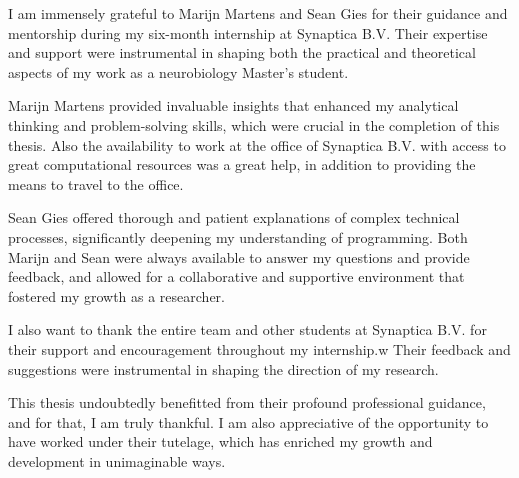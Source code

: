 \noindent I am immensely grateful to Marijn Martens and Sean Gies for their guidance and mentorship
during my six-month internship at Synaptica B.V. Their expertise and support were instrumental
in shaping both the practical and theoretical aspects of my work as a neurobiology Master's student.

Marijn Martens provided invaluable insights that enhanced
my analytical thinking and problem-solving skills, which were crucial
in the completion of this thesis. Also the availability to work
at the office of Synaptica B.V. with access to great computational resources was a great help,
in addition to providing the means to travel to the office.

Sean Gies offered thorough and patient  explanations of complex technical processes,
significantly deepening my understanding of programming. Both Marijn and Sean were always
available to answer my questions and provide feedback, and allowed for
a collaborative and supportive environment that fostered my growth as a researcher.

I also want to thank the entire team and other students at Synaptica B.V. for their support and encouragement throughout my internship.w
Their feedback and suggestions were instrumental in shaping the direction of my research.

This thesis undoubtedly benefitted from their profound professional guidance, and for that, I am truly thankful.
I am also appreciative of the opportunity to have worked under their tutelage, which has enriched my growth and
development in unimaginable ways.
